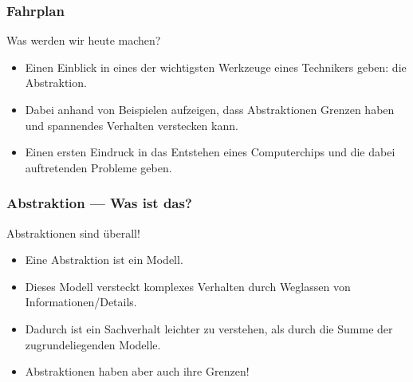 \begin{frame}
	\frametitle{Fahrplan}

	\begin{block}{Was werden wir heute machen?}
		\begin{itemize}
			\item Einen Einblick in eines der wichtigsten Werkzeuge eines
				Technikers geben: die Abstraktion.
			\item Dabei anhand von Beispielen aufzeigen, dass Abstraktionen
				Grenzen haben und spannendes Verhalten verstecken kann.
			\item Einen ersten Eindruck in das Entstehen eines Computerchips
				und die dabei auftretenden Probleme geben.
		\end{itemize}
	\end{block}
\end{frame}

\begin{frame}
	\frametitle{Abstraktion --- Was ist das?}

	\begin{block}{Abstraktionen sind überall!}
		\begin{itemize}
			\item Eine Abstraktion ist ein Modell.
			\item Dieses Modell versteckt komplexes Verhalten durch Weglassen
				von Informationen/Details.
			\item Dadurch ist ein Sachverhalt leichter zu verstehen, als durch die
				Summe der zugrundeliegenden Modelle.
			\item Abstraktionen haben aber auch ihre Grenzen!
		\end{itemize}
	\end{block}

\end{frame}

